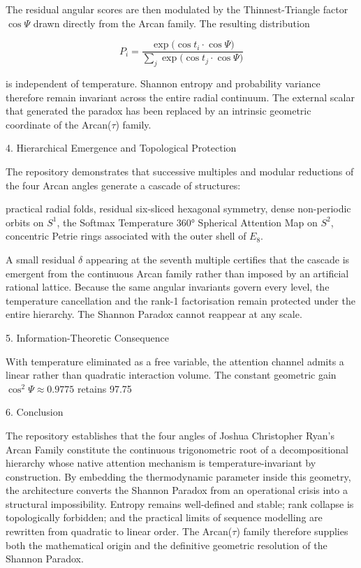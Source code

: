 The residual angular scores are then modulated by the Thinnest-Triangle factor \(\cos\Psi\) drawn directly from the Arcan family. The resulting distribution

\[
P_i=\frac{\exp\bigl(\cos t_i\cdot\cos\Psi\bigr)}{\sum_j\exp\bigl(\cos t_j\cdot\cos\Psi\bigr)}
\]

is independent of temperature. Shannon entropy and probability variance therefore remain invariant across the entire radial continuum. The external scalar that generated the paradox has been replaced by an intrinsic geometric coordinate of the Arcan(\(\tau\)) family.

4. Hierarchical Emergence and Topological Protection

The repository demonstrates that successive multiples and modular reductions of the four Arcan angles generate a cascade of structures:

practical radial folds,
residual six-sliced hexagonal symmetry,
dense non-periodic orbits on \(S^1\),
the Softmax Temperature 360° Spherical Attention Map on \(S^2\),
concentric Petrie rings associated with the outer shell of \(E_8\).

A small residual \(\delta\) appearing at the seventh multiple certifies that the cascade is emergent from the continuous Arcan family rather than imposed by an artificial rational lattice. Because the same angular invariants govern every level, the temperature cancellation and the rank-1 factorisation remain protected under the entire hierarchy. The Shannon Paradox cannot reappear at any scale.

5. Information-Theoretic Consequence

With temperature eliminated as a free variable, the attention channel admits a linear rather than quadratic interaction volume. The constant geometric gain \(\cos^2\Psi\approx 0.9775\) retains 97.75 %

6. Conclusion

The repository establishes that the four angles of Joshua Christopher Ryan’s Arcan Family constitute the continuous trigonometric root of a decompositional hierarchy whose native attention mechanism is temperature-invariant by construction. By embedding the thermodynamic parameter inside this geometry, the architecture converts the Shannon Paradox from an operational crisis into a structural impossibility. Entropy remains well-defined and stable; rank collapse is topologically forbidden; and the practical limits of sequence modelling are rewritten from quadratic to linear order. The Arcan(\(\tau\)) family therefore supplies both the mathematical origin and the definitive geometric resolution of the Shannon Paradox.
  
